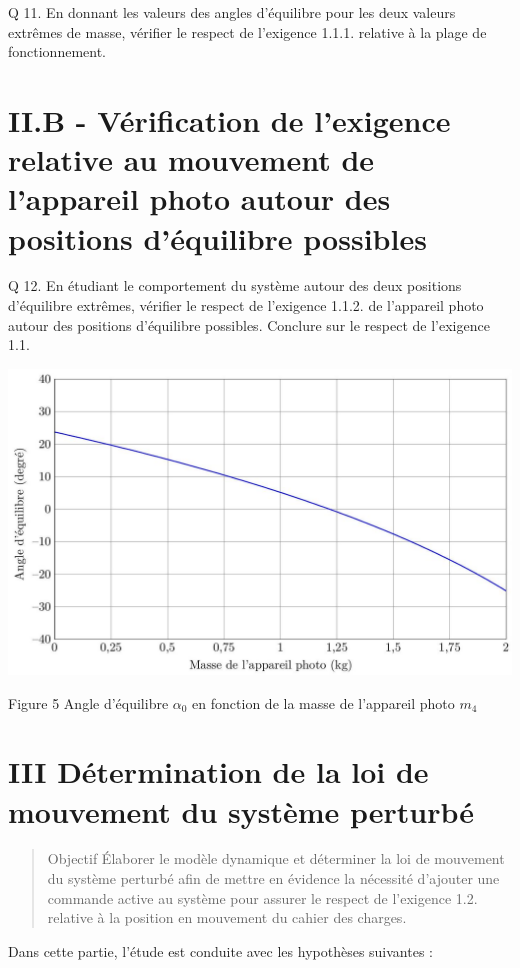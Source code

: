 \documentclass[10pt]{article}
\begin{document}
Q 11. En donnant les valeurs des angles d'équilibre pour les deux valeurs extrêmes de masse, vérifier le respect de l'exigence 1.1.1. relative à la plage de fonctionnement.

\section{II.B - Vérification de l'exigence relative au mouvement de l'appareil photo autour des positions d'équilibre possibles}
Q 12. En étudiant le comportement du système autour des deux positions d'équilibre extrêmes, vérifier le respect de l'exigence 1.1.2. de l'appareil photo autour des positions d'équilibre possibles. Conclure sur le respect de l'exigence 1.1.

\begin{center}
\includegraphics[max width=\textwidth]{2022_12_31_ed674c1a831ea1bff3a0g-05}
\end{center}

Figure 5 Angle d'équilibre $\alpha_{0}$ en fonction de la masse de l'appareil photo $m_{4}$

\section*{III Détermination de la loi de mouvement du système perturbé }
\begin{abstract}
Objectif Élaborer le modèle dynamique et déterminer la loi de mouvement du système perturbé afin de mettre en évidence la nécessité d'ajouter une commande active au système pour assurer le respect de l'exigence 1.2. relative à la position en mouvement du cahier des charges.
\end{abstract}

Dans cette partie, l'étude est conduite avec les hypothèses suivantes :
\end{document}
